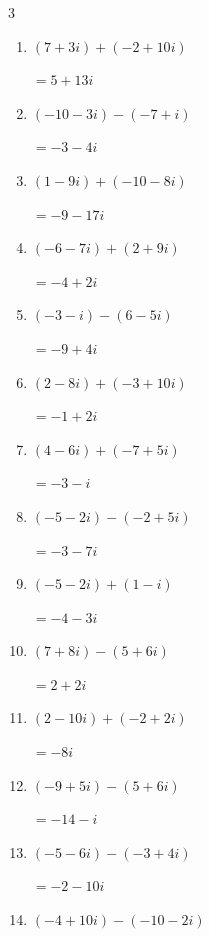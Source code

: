 \begin{multicols}{3}
\begin{enumerate}
        $\displaystyle =-4-9i$

  \item $\displaystyle (7+3i) + (-2+10i)$

        $\displaystyle =5+13i$

  \item $\displaystyle (-10-3i) - (-7+i)$

        $\displaystyle =-3-4i$

  \item $\displaystyle (1-9i) + (-10-8i)$

        $\displaystyle =-9-17i$

  \item $\displaystyle (-6-7i) + (2+9i)$

        $\displaystyle =-4+2i$

  \item $\displaystyle (-3-i) - (6-5i)$

        $\displaystyle =-9+4i$

  \item $\displaystyle (2-8i) + (-3+10i)$

        $\displaystyle =-1+2i$

  \item $\displaystyle (4-6i) + (-7+5i)$

        $\displaystyle =-3-i$

  \item $\displaystyle (-5-2i) - (-2+5i)$

        $\displaystyle =-3-7i$

  \item $\displaystyle (-5-2i) + (1-i)$

        $\displaystyle =-4-3i$

  \item $\displaystyle (7+8i) - (5+6i)$

        $\displaystyle =2+2i$

  \item $\displaystyle (2-10i) + (-2+2i)$

        $\displaystyle =-8i$

  \item $\displaystyle (-9+5i) - (5+6i)$

        $\displaystyle =-14-i$

  \item $\displaystyle (-5-6i) - (-3+4i)$

        $\displaystyle =-2-10i$

  \item $\displaystyle (-4+10i) - (-10-2i)$


\end{enumerate}
\end{multicols}

